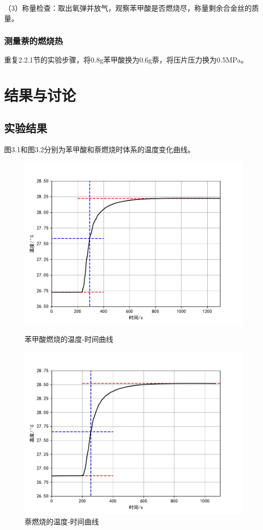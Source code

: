 \documentclass[12pt]{ctexart}
\numberwithin{equation}{section}
\begin{document}
（3）称量检查：取出氧弹并放气，观察苯甲酸是否燃烧尽，称量剩余合金丝的质量。

\subsubsection{测量萘的燃烧热}
重复2.2.1节的实验步骤，将0.8g苯甲酸换为0.6g萘，将压片压力换为0.5MPa。

\section{结果与讨论}
\subsection{实验结果}
图3.1和图3.2分别为苯甲酸和萘燃烧时体系的温度变化曲线。
\begin{figure}[!h]
\begin{minipage}[t]{0.5\linewidth}
    \centering
    \includegraphics[scale=0.6]{ben.pdf}
    \caption{苯甲酸燃烧的温度-时间曲线}
\end{minipage}
\begin{minipage}[t]{0.5\linewidth}
    \centering
    \includegraphics[scale=0.6]{nai.pdf}
    \caption{萘燃烧的温度-时间曲线}
\end{minipage}
\end{figure}
\end{document}
